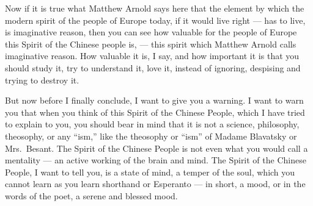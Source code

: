 Now if it is true what Matthew Arnold says here that the element by which the modern spirit of the people of Europe today, if it would live right --- has to live, is imaginative reason, then you can see how valuable for the people of Europe this Spirit of the Chinese people is, --- this spirit which Matthew Arnold calls imaginative reason.
How valuable it is, I say, and how important it is that you should study it, try to understand it, love it, instead of ignoring, despising and trying to destroy it.

\vspace{0.5cm}
But now before I finally conclude, I want to give you a warning.
I want to warn you that when you think of this Spirit of the Chinese People, which I have tried to explain to you, you should bear in mind that it is not a science, philosophy, theosophy, or any ``ism,'' like the theosophy or ``ism'' of Madame Blavatsky  or Mrs.~Besant. 
The Spirit of the Chinese People is not even what you would call a mentality --- an active working of the brain and mind.
The Spirit of the Chinese People, I want to tell you, is a state of mind, a temper of the soul, which you cannot learn as you learn shorthand or Esperanto --- in short, a mood, or in the words of the poet, a serene and blessed mood.

